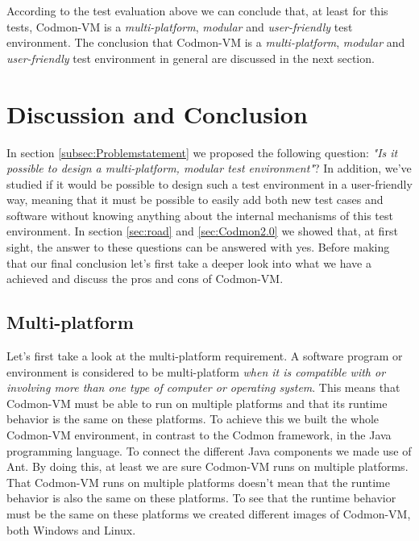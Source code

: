 \documentclass{article}
\newcommand{\project}{Codmon-VM}
\begin{document}
\noindent According to the test evaluation above we can conclude that, at least for this tests, \project{} is a \emph{multi-platform}, \emph{modular} and \emph{user-friendly} test environment. The conclusion 
that \project{} is a \emph{multi-platform}, \emph{modular} and \emph{user-friendly} test environment in general are discussed in the next section.


\newpage
\section{Discussion and Conclusion}
\label{sec:evaluation}
In section \ref{subsec:Problemstatement} we proposed the following question: \emph{"Is it possible to design a multi-platform, modular test environment"}? In addition, we've studied if it would be 
possible to design such a test environment in a user-friendly way, meaning that it must be possible to easily add both new test cases and software without knowing anything about the internal mechanisms of this test environment. 
In section \ref{sec:road} and \ref{sec:Codmon2.0} we showed that, at first sight, the answer to these questions can be answered with yes. Before making that our final conclusion let's first take a deeper look 
into what we have a achieved and discuss the pros and cons of \project{}. \\

\subsection{Multi-platform}
\label{dis:multi}
Let's first take a look at the multi-platform requirement. A software program or environment is considered to be multi-platform \emph{when it is compatible with or involving more than one type of computer or 
operating system}\cite{def:multi}. This means that \project{} must be able to run on multiple platforms and that its runtime behavior is the same on these platforms. To achieve this we built the whole 
\project{} environment, in contrast to the Codmon framework, in the Java programming language. To connect the different Java components we made use of Ant. By doing this, at least we are sure \project{} 
runs on multiple platforms\cite{Java}.\\

\noindent That \project{} runs on multiple platforms doesn't mean that the runtime behavior is also the same on these platforms. To see that the runtime behavior must be the same on these platforms we created 
different images of \project{}, both Windows and Linux.\\
\end{document}
